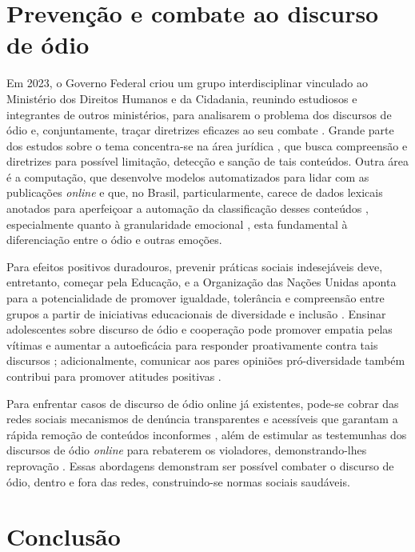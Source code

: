 \documentclass[portuguese]{textolivre}
\begin{document}
\section{Prevenção e combate ao discurso de ódio}

Em 2023, o Governo Federal criou um grupo interdisciplinar vinculado ao Ministério dos Direitos Humanos e da Cidadania, reunindo estudiosos e integrantes de outros ministérios, para analisarem o problema dos discursos de ódio e, conjuntamente, traçar diretrizes eficazes ao seu combate \cite{rodrigues2023}. Grande parte dos estudos sobre o tema concentra-se na área jurídica \cite{brown2017hate}, que busca compreensão e diretrizes para possível limitação, detecção e sanção de tais conteúdos. Outra área é a computação, que desenvolve modelos automatizados para lidar com as publicações \emph{online} e que, no Brasil, particularmente, carece de dados lexicais anotados para aperfeiçoar a automação da classificação desses conteúdos \cite{santos2022}, especialmente quanto à granularidade emocional \cite{cortiz2021weakly}, esta fundamental à diferenciação entre o ódio e outras emoções.

Para efeitos positivos duradouros, prevenir práticas sociais indesejáveis deve, entretanto, começar pela Educação, e a Organização das Nações Unidas aponta para a potencialidade de promover igualdade, tolerância e compreensão entre grupos a partir de iniciativas educacionais de diversidade e inclusão \cite{united20192020b}. Ensinar adolescentes sobre discurso de ódio e cooperação pode promover empatia pelas vítimas e aumentar a autoeficácia para responder proativamente contra tais discursos \cite{wachs2023effects}; adicionalmente, comunicar aos pares opiniões pró-diversidade também contribui para promover atitudes positivas \cite{murrar2020exposure}.

Para enfrentar casos de discurso de ódio online já existentes, pode-se cobrar das redes sociais mecanismos de denúncia transparentes e acessíveis que garantam a rápida remoção de conteúdos inconformes \cite{getahun2023countering}, além de estimular as testemunhas dos discursos de ódio \emph{online} para rebaterem os violadores, demonstrando-lhes reprovação \cite{obermaier2023too}. Essas abordagens demonstram ser possível combater o discurso de ódio, dentro e fora das redes, construindo-se normas sociais saudáveis.



\section{Conclusão}
\end{document}
